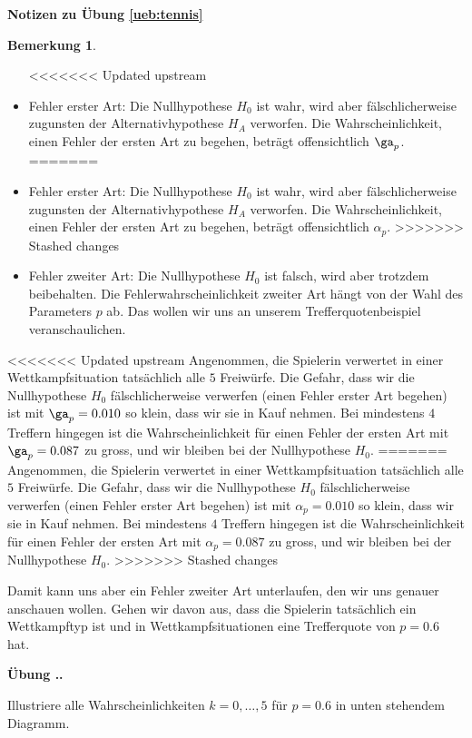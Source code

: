 \documentclass[%
<<<<<<< Updated upstream
11pt,%
twoside,%
titlepage,%
german,%
=======
11pt,%
twoside,%
titlepage,%
swissgerman,%
>>>>>>> Stashed changes
headsepline%
]{scrartcl}
\newcommand{\faEyeLightGray}{\textcolor{lightgray}{\faEye}} %
\newcommand{\faReturnGray}{\textcolor{gray}{\faMailReply}} %
\newcommand{\faEyeLightGray}{\textcolor{lightgray}{\faEye}} %
\newcommand{\definition}[1]{\colorbox{emerald}{#1}}
\theoremstyle{definition}
\newtheorem{bem}{Bemerkung}[subsection] %
\theoremstyle{plain}
\newcommand{\concatueb}[1]{ueb:#1}%
\newcommand{\concatlsg}[1]{lsg:#1}%
\newcounter{uebcounter}[section]
\renewcommand{\theuebcounter}{\thesection.\arabic{uebcounter}}  %
\newenvironment{lsg}[1]{%
    \par\noindent\textbf{Notizen zu Übung \ref{\concatueb{#1}}}\label{\concatlsg{#1}}
    \hfill\hyperref[\concatueb{#1}]{\faReturnGray}\par %
}{%
    \par%
}
\newenvironment{uebenv}[1]{%
    \refstepcounter{uebcounter}
    \par\noindent\textbf{Übung \theuebcounter.}%
    \label{\concatueb{#1}}\hfill\hyperref[\concatlsg{#1}]{\faEyeLightGray}\par
}{%
    \par
}
\newcounter{theo}[section]\setcounter{theo}{0}
\newcommand{\concatueb}[1]{ueb:#1}%
\newcommand{\concatlsg}[1]{lsg:#1}%
\newcounter{uebcounter}[section]
\renewcommand{\theuebcounter}{\thesection.\arabic{uebcounter}}  %
\newenvironment{lsg}[1]{%
    \par\noindent\textbf{Notizen zu Übung \ref{\concatueb{#1}}.}%
    \label{\concatlsg{#1}}
}{%
    \par%
}
\newenvironment{uebenv}[1]{%
    \refstepcounter{uebcounter}
    \par\noindent\textbf{Übung \theuebcounter.}%
    \label{\concatueb{#1}}\hfill\hyperref[\concatlsg{#1}]{\faEyeLightGray}\newline
}{%
    \par
}
\newcommand{\definition}[1]{\colorbox{emerald}{#1}}
\begin{document}
\begin{lsg}{tennis}
\begin{bem}
\begin{itemize}
<<<<<<< Updated upstream
\item \definition{Fehler erster Art}: Die Nullhypothese $H_0$ ist wahr, wird aber fälschlicherweise zugunsten der Alternativhypothese $H_A$ verworfen. Die Wahrscheinlichkeit, einen Fehler der ersten Art zu begehen, beträgt offensichtlich $\ga_p$.
=======
\item \definition{Fehler erster Art}: Die Nullhypothese $H_0$ ist wahr, wird aber fälschlicherweise zugunsten der Alternativhypothese $H_A$ verworfen. Die Wahrscheinlichkeit, einen Fehler der ersten Art zu begehen, beträgt offensichtlich $\alpha_p$.
>>>>>>> Stashed changes
\item \definition{Fehler zweiter Art}:
Die Nullhypothese $H_0$ ist falsch, wird aber trotzdem beibehalten. Die Fehlerwahrscheinlichkeit zweiter Art hängt von der Wahl des Parameters $p$ ab. Das wollen wir uns an unserem Trefferquotenbeispiel veranschaulichen.
\end{itemize}

<<<<<<< Updated upstream
Angenommen, die Spielerin verwertet in einer Wettkampfsituation tatsächlich alle $5$ Freiwürfe. Die Gefahr, dass wir die Nullhypothese $H_0$ fälschlicherweise verwerfen (einen Fehler erster Art begehen) ist mit $\ga_p=0.010$ so klein, dass wir sie in Kauf nehmen. Bei mindestens $4$ Treffern hingegen ist die Wahrscheinlichkeit für einen Fehler der ersten Art mit $\ga_p=0.087$ zu gross, und wir bleiben bei der Nullhypothese $H_0$.
=======
Angenommen, die Spielerin verwertet in einer Wettkampfsituation tatsächlich alle $5$ Freiwürfe. Die Gefahr, dass wir die Nullhypothese $H_0$ fälschlicherweise verwerfen (einen Fehler erster Art begehen) ist mit $\alpha_p=0.010$ so klein, dass wir sie in Kauf nehmen. Bei mindestens $4$ Treffern hingegen ist die Wahrscheinlichkeit für einen Fehler der ersten Art mit $\alpha_p=0.087$ zu gross, und wir bleiben bei der Nullhypothese $H_0$.
>>>>>>> Stashed changes

Damit kann uns aber ein Fehler zweiter Art unterlaufen, den wir uns genauer anschauen wollen. Gehen wir davon aus, dass die Spielerin tatsächlich ein Wettkampftyp ist und in Wettkampfsituationen eine Trefferquote von $p=0.6$ hat.

\begin{uebenv}{illustrierefehlerzweiterart}
Illustriere alle Wahrscheinlichkeiten $k=0,\dots,5$ für $p=0.6$ in unten stehendem Diagramm.

\begin{center}
\begin{tikzpicture}[yscale=10] %


\end{tikzpicture}
\end{center}
\end{uebenv}
\end{bem}
\end{lsg}
\end{document}
